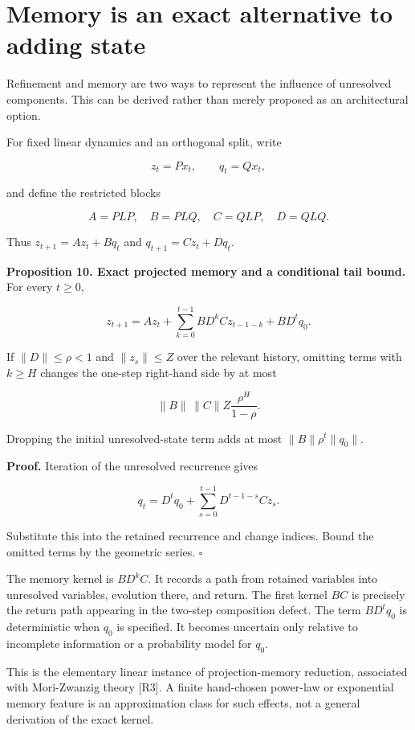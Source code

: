 \section{Memory is an exact alternative to adding state}\label{LSM:memory-is-an-exact-alternative-to-adding-state}

Refinement and memory are two ways to represent the influence of
unresolved components. This can be derived rather than merely proposed
as an architectural option.

For fixed linear dynamics and an orthogonal split, write

\[
z_t=Px_t,\qquad q_t=Qx_t,
\]

and define the restricted blocks

\[
A=PLP,\quad B=PLQ,\quad C=QLP,\quad D=QLQ.
\]

Thus \(z_{t+1}=Az_t+Bq_t\) and \(q_{t+1}=Cz_t+Dq_t\).

\textbf{Proposition 10. Exact projected memory and a conditional tail
bound.} For every \(t\geq0\),

\[
\boxed{
z_{t+1}=Az_t+
\sum_{k=0}^{t-1}BD^kCz_{t-1-k}+BD^tq_0.
}
\]

If \(\|D\|\leq\rho<1\) and \(\|z_s\|\leq Z\) over the relevant history,
omitting terms with \(k\geq H\) changes the one-step right-hand side by
at most

\[
\|B\|\,\|C\|Z\frac{\rho^H}{1-\rho}.
\]

Dropping the initial unresolved-state term adds at most
\(\|B\|\rho^t\|q_0\|\).

\textbf{Proof.} Iteration of the unresolved recurrence gives

\[
q_t=D^tq_0+\sum_{s=0}^{t-1}D^{t-1-s}Cz_s.
\]

Substitute this into the retained recurrence and change indices. Bound
the omitted terms by the geometric series. \(\square\)

The memory kernel is \(BD^kC\). It records a path from retained
variables into unresolved variables, evolution there, and return. The
first kernel \(BC\) is precisely the return path appearing in the
two-step composition defect. The term \(BD^tq_0\) is deterministic when
\(q_0\) is specified. It becomes uncertain only relative to incomplete
information or a probability model for \(q_0\).

This is the elementary linear instance of projection-memory reduction,
associated with Mori-Zwanzig theory {[}R3{]}. A finite hand-chosen
power-law or exponential memory feature is an approximation class for
such effects, not a general derivation of the exact kernel.

